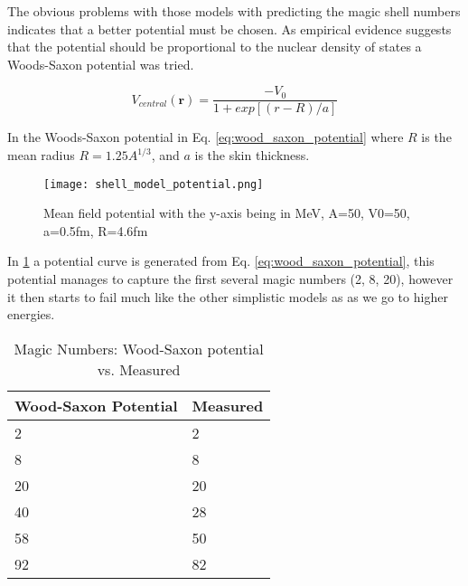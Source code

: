 \documentclass[jon_ringuette_thesis.tex]{subfiles}
\begin{document}
    The obvious problems with those models with predicting the magic shell numbers indicates that a better potential must be chosen.
    As empirical evidence suggests that the potential should be proportional to the nuclear density of states a Woods-Saxon potential was tried.

    \begin{equation}
        V_{central}(\mathbf{r}) = \frac{-V_0}{1 + exp[(r - R)/a]}
        \label{eq:wood_saxon_potential}
    \end{equation}

    In the Woods-Saxon potential in Eq. \ref{eq:wood_saxon_potential} where $R$ is the mean radius $R=1.25A^{1/3}$, and $a$ is the skin thickness.

    \begin{figure}[H]
        \begin{center}
            \texttt{[image: shell\_model\_potential.png]}
        \end{center}
        \caption{Mean field potential with the y-axis being in MeV, A=50, V0=50, a=0.5fm, R=4.6fm}
        \label{fig:shell_model_potential}
    \end{figure}

    In \ref{fig:shell_model_potential} a potential curve is generated from Eq. \ref{eq:wood_saxon_potential}, this potential manages to capture the first several magic numbers (2, 8, 20), however it then starts to fail much like the other simplistic models as as we go to higher energies.

    \begin{table}
        \centering
        \caption{Magic Numbers: Wood-Saxon potential vs. Measured }
        \label{wood_saxon_vs_measured}
        \begin{tabular}{|l|l|}
            \hline
            Wood-Saxon Potential & Measured \\
            \hline
            2                    & 2        \\
            \hline
            8                    & 8        \\
            \hline
            20                   & 20       \\
            \hline
            40                   & 28       \\
            \hline
            58                   & 50       \\
            \hline
            92                   & 82       \\
            \hline
        \end{tabular}
    \end{table}
\end{document}
